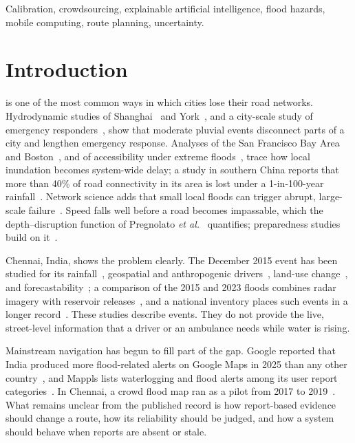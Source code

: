 \documentclass[journal]{IEEEtran}
\begin{document}
\begin{IEEEkeywords}
Calibration, crowdsourcing, explainable artificial intelligence, flood hazards, mobile computing, route planning, uncertainty.
\end{IEEEkeywords}

\section{Introduction}
 is one of the most common ways in which cities lose their road networks. Hydrodynamic studies of Shanghai~\cite{yin2016shanghai} and York~\cite{coles2017york}, and a city-scale study of emergency responders~\cite{green2017emergency}, show that moderate pluvial events disconnect parts of a city and lengthen emergency response. Analyses of the San Francisco Bay Area~\cite{kasmalkar2020floods} and Boston~\cite{suarez2005boston}, and of accessibility under extreme floods~\cite{papilloud2021vulnerability}, trace how local inundation becomes system-wide delay; a study in southern China reports that more than 40\% of road connectivity in its area is lost under a 1-in-100-year rainfall~\cite{zhou2022connectivity}. Network science adds that small local floods can trigger abrupt, large-scale failure~\cite{wang2019percolation}. Speed falls well before a road becomes impassable, which the depth--disruption function of Pregnolato \emph{et al.}~\cite{pregnolato2017depth} quantifies; preparedness studies build on it~\cite{arrighi2019preparedness}.

Chennai, India, shows the problem clearly. The December 2015 event has been studied for its rainfall~\cite{vanoldenborgh2016chennai,panda2022observed,dutta2024uncovering}, geospatial and anthropogenic drivers~\cite{seenirajan2017chennai,ramasamy2018geoanthropogenic}, land-use change~\cite{devi2019sprawl,rath2018study}, and forecastability~\cite{paul2026aerosols}; a comparison of the 2015 and 2023 floods combines radar imagery with reservoir releases~\cite{radhakrishnan2024chennai}, and a national inventory places such events in a longer record~\cite{saharia2021inventory}. These studies describe events. They do not provide the live, street-level information that a driver or an ambulance needs while water is rising.

Mainstream navigation has begun to fill part of the gap. Google reported that India produced more flood-related alerts on Google Maps in 2025 than any other country~\cite{ramani2025maps}, and Mappls lists waterlogging and flood alerts among its user report categories~\cite{mappls2026post}. In Chennai, a crowd flood map ran as a pilot from 2017 to 2019~\cite{urbanrisklab2019riskmap}. What remains unclear from the published record is how report-based evidence should change a route, how its reliability should be judged, and how a system should behave when reports are absent or stale.
\end{document}
